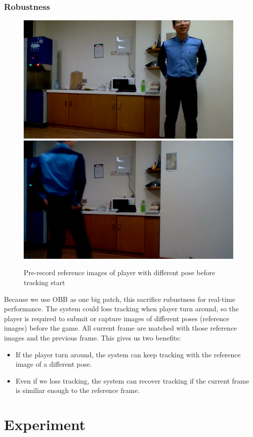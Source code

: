\documentclass[11pt,twocolumn,letterpaper]{article}
\begin{document}
\subsubsection*{Robustness}
\begin{figure}[h]
      \centering
      \includegraphics[width=0.45\linewidth]{./Pic/ref-1}
\includegraphics[width=0.45\linewidth]{./Pic/ref-2}
      \caption{Pre-record reference images of player with different pose before tracking start}
      \end{figure}

Because we use OBB as one big patch, this sacrifice rubustness for real-time performance. The system could loss tracking when player turn around, so the player is required to submit or capture images of different poses (reference images) before the game. All current frame are matched with those reference images and the previous frame. This gives us two benefits:
\begin{itemize}
\item If the player turn around, the system can keep tracking with the reference image of a different pose.
\item Even if we loss tracking, the system can recover tracking if the current frame is similiar enough to the reference frame.
\end{itemize}
\section{Experiment}
\end{document}
